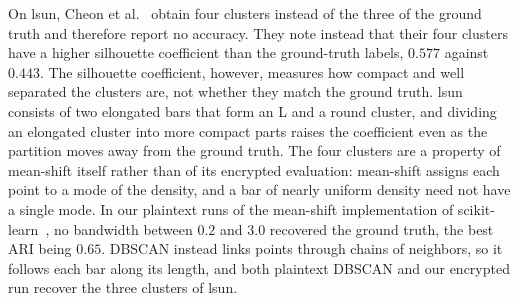 On lsun, Cheon et al.~\cite{cheon2019towards} obtain four clusters
instead of the three of the ground truth and therefore report no
accuracy. They note instead that their four clusters have a higher
silhouette coefficient than the ground-truth labels, $0.577$ against
$0.443$. The silhouette coefficient, however, measures how compact and
well separated the clusters are, not whether they match the ground truth.
lsun consists of two elongated bars that form an L and a round cluster,
and dividing an elongated cluster into more compact parts raises the
coefficient even as the partition moves away from the ground truth. The
four clusters are a property of mean-shift itself rather than of its
encrypted evaluation: mean-shift assigns each point to a mode of the
density, and a bar of nearly uniform density need not have a single mode.
In our plaintext runs of the mean-shift implementation of
scikit-learn~\cite{pedregosa2011scikit}, no bandwidth between $0.2$ and
$3.0$ recovered the ground truth, the best ARI being $0.65$. DBSCAN
instead links points through chains of neighbors, so it follows each bar
along its length, and both plaintext DBSCAN and our encrypted run recover
the three clusters of lsun.
